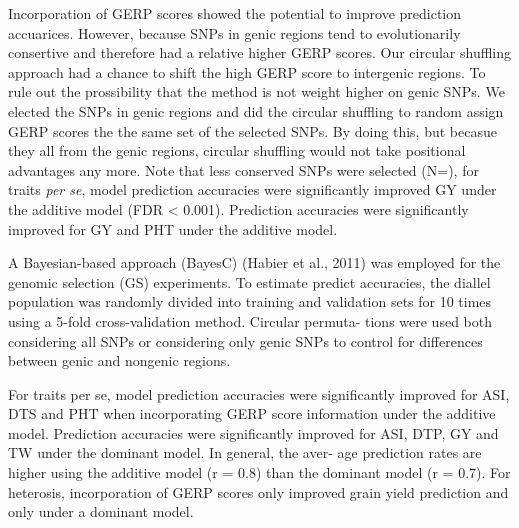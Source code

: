 \documentclass[9pt,twocolumn,twoside]{gsajnl}
\begin{document}
Incorporation of GERP scores showed the potential to improve prediction accuarices. However, because SNPs in genic regions tend to evolutionarily consertive and therefore had a relative higher GERP scores. Our circular shuffling approach had a chance to shift the high GERP score to intergenic regions. To rule out the prossibility that the method is not weight higher on genic SNPs. We elected the SNPs in genic regions and did the circular shuffling to random assign GERP scores the the same set of the selected SNPs. By doing this,  but becasue they all from the genic regions, circular shuffling would not take positional advantages any more. Note that less conserved SNPs were selected (N=), for traits \emph{per se}, model prediction accuracies were significantly improved GY under the additive model (FDR < 0.001). Prediction accuracies were significantly improved for GY and PHT under the additive model.   

A Bayesian-based approach (BayesC) (Habier et al., 2011) was employed for the genomic selection (GS) experiments. To estimate predict accuracies, the diallel population was randomly divided into training and validation sets for 10 times using a 5-fold cross-validation method. Circular permuta- tions were used both considering all SNPs or considering only genic SNPs to control for differences between genic and nongenic regions.

For traits per se, model prediction accuracies were significantly improved for ASI, DTS and PHT when incorporating GERP score information under the additive model. Prediction accuracies were significantly improved for ASI, DTP, GY and TW under the dominant model. In general, the aver- age prediction rates are higher using the additive model (r = 0.8) than the dominant model (r = 0.7). For heterosis, incorporation of GERP scores only improved grain yield prediction and only under a dominant model.
\end{document}
